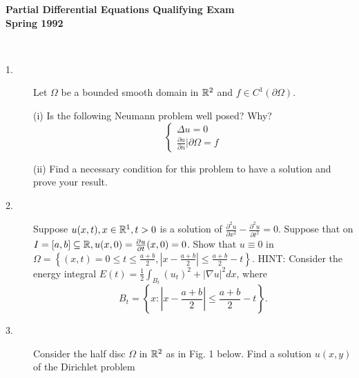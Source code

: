 \documentclass{article}
\begin{document}






\begin{center}\begin{LARGE}
{\bf Partial Differential Equations Qualifying Exam}\\ 
{\bf Spring 1992}\\ \end{LARGE}
\end{center}
\vspace{0.1in}
\noindent\hrulefill\\

\begin{description}
\item[1.]
Let $\Omega$ be a bounded smooth domain in $\Bbb R^2$ and
$f \in C^1(\partial \Omega)$.

\item[\quad] (i)
Is the following Neumann problem well posed? Why?
$$\begin{cases}
        \Delta u = 0 \\
        \frac{\partial u }{\partial n} |\partial \Omega = f
        \end{cases}$$

\item[\quad] (ii)
Find a necessary condition for this problem to have a solution and prove
your result.

\item[2.]
Suppose $u(x,t), x \in \Bbb R^1, t>0$ is a solution of
$\frac{\partial^2 u}{\partial x^2} - \frac{\partial^2 u}{\partial t^2} =0$.
Suppose that on
$I=[a,b] \subseteq \Bbb R, u(x,0) = \frac{\partial u}{\partial t} (x,0)=0$.
Show that $u \equiv 0$ in
$\Omega = \left\{(x,t)= 0 \leq t \leq \frac{a+b}{2}, \left|x- \frac{a+b}{2}
  \right| \leq \frac{a+b}{2} - t \right\}.$
HINT: Consider the energy integral
$E(t) = \frac{1}{2} \int_{B_t} (u_t)^2 + |\nabla u|^2 dx$, where
$$B_t = \left\{x : \left| x- \frac{a+b}{2} \right|
  \leq \frac{a+b}{2} - t \right\}.$$

\item[3.]
Consider the half disc $\Omega$ in $\Bbb R^2$ as in Fig. 1 below. Find a
solution $u(x,y)$ of the Dirichlet problem


\end{description}
\end{document}
